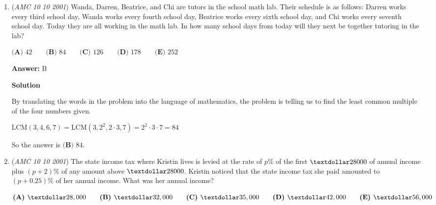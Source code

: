 \begin{enumerate}
 \textbf{Answer: }C



\textbf{Solution 1}

If $x$ is the number, then moving the decimal point four places to the right is the same as multiplying $x$ by $10000$. This gives us:  
 \[10000x=4\cdot\frac{1}{x} \implies x^2=\frac{4}{10000}\] Since 
 \[x>0\implies x=\frac{2}{100}=\boxed{\textbf{(C)}\ 0.02}\]




\textbf{Solution 2}

Alternatively, we could try each solution and see if it fits the problems given statements.

 After testing, we find that $\boxed{\textbf{(C)}\ 0.02}$ is the correct answer.

 


	\item (\textit{AMC 10 10 2001}) Wanda, Darren, Beatrice, and Chi are tutors in the school math lab. Their
schedule is as follows: Darren works every third school day, Wanda works
every fourth school day, Beatrice works every sixth school day, and Chi works
every seventh school day. Today they are all working in the math lab. In how
many school days from today will they next be together tutoring in the lab?


 $\textbf{(A) } 42 \qquad\textbf{(B) } 84 \qquad\textbf{(C) } 126 \qquad\textbf{(D) } 178 \qquad\textbf{(E) } 252$

 \textbf{Answer: }B



\textbf{Solution}

By translating the words in the problem into the language of mathematics, the problem is telling us to find the least common multiple of the four numbers given. 

 $\textrm{LCM}(3, 4, 6, 7) = \textrm{LCM}(3, 2^2, 2 \cdot 3, 7) = 2^2 \cdot 3 \cdot 7 = 84$

 So the answer is $\boxed{\textbf{(B) } 84}$.

 


	\item (\textit{AMC 10 10 2001}) The state income tax where Kristin lives is levied at the rate of $p\%$ of the first $\textdollar 28000$ of annual income plus $(p + 2)\%$ of any amount above $\textdollar 28000$. Kristin noticed that the state income tax she paid amounted to $(p + 0.25)\%$ of her annual income. What was her annual income?


 $\textbf{(A) } \textdollar 28,000\qquad\textbf{(B) } \textdollar 32,000\qquad\textbf{(C) }\textdollar 35,000\qquad\textbf{(D) } \textdollar 42,000\qquad\textbf{(E) } \textdollar 56,000$


\end{enumerate}
